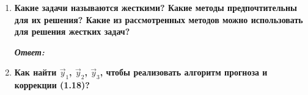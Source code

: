 \documentclass[12pt, a4paper]{article}
\begin{document}
\begin{enumerate}
		\textit{\textbf{Ответ:}}
		
		\begin{enumerate}
			\item Метод Эйлера:
			\begin{gather}
				\text{Порядок точности:}\;\; O(\tau)  \notag\\
				\text{Порядок Аппроксимации:}\;\; O(\tau) \notag
			\end{gather}
			\item Метод Рунге -- Кутты:
			\begin{gather}
				\text{Порядок точности:}\;\; O(\tau^4)  \notag\\
				\text{Порядок Аппроксимации:}\;\; O(\tau^4) \notag
			\end{gather}
			Замечание: порядок точности метода Рунге -- Кутты совпадает с его порядком аппроксимации
			\item Метод Адамса -- Башфорта:
			\begin{gather}
				\text{Порядок точности:}\;\; O(\tau^4)  \notag\\
				\text{Порядок Аппроксимации:}\;\; O(\tau^4) \notag
			\end{gather}
			Замечание: для обеспечения порядка аппроксимации порядка $p$ должны выполнятся $p+1$ уравнений
			\[
			\sum\limits^{m}_{k=0}\dfrac{1}{\tau}a_k = 0,\;\;\sum\limits^{m}_{k=0}k^{l-1}(b_k + a_k \dfrac{k}{l})=0,\;\;l=1, 2, \ldots, p
			\]
			и условие нормировки
			\[
			\sum\limits_{k=0}^{m} b_k = 1
			\]
			где линейный m-шаговый разностный метод:
			\[
			\dfrac{a_0 y_n + a_1 y_{n-1} + \ldots + a_m y_{n-m}}{\tau} = b_0 f_n + b_1 f_{n-1} + \ldots + b_m f_{n-m}
			\]
			\item Метод <<предикор -- корректор>>:
			\begin{gather}
				\text{Порядок точности:}\;\; O(\tau^4)  \notag\\
				\text{Порядок Аппроксимации:}\;\; O(\tau^4) \notag %
			\end{gather}
		\end{enumerate}
		
		\item \textbf{Какие задачи называются жесткими? Какие методы предпочтительны для их решения? Какие из рассмотренных методов можно использовать для решения жестких задач?}
		\vspace*{0.2cm}
		
		\textit{\textbf{Ответ:}}
		
		\item \textbf{Как найти $\vec{y}_1$, $\vec{y}_2$, $\vec{y}_3$, чтобы реализовать алгоритм прогноза и коррекции (1.18)?}
		\vspace*{0.2cm}
		

\end{enumerate}
\end{document}
